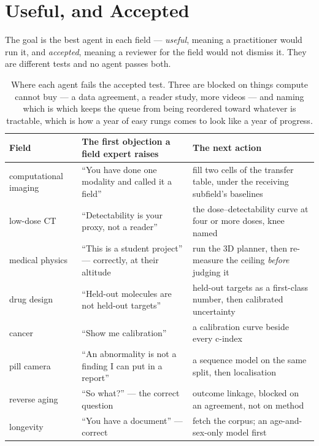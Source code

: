 \documentclass[11pt]{article}
\theoremstyle{definition}
\begin{document}
\section{Useful, and Accepted}\label{sec:useful}

The goal is the best agent in each field --- \emph{useful}, meaning a practitioner would run it, and \emph{accepted}, meaning a reviewer for the field would not dismiss it. They are different tests and no agent passes both.

\begin{table}[!htbp]
\centering\small
\begin{tabularx}{\textwidth}{@{}lYY@{}}
\toprule
Field & The first objection a field expert raises & The next action \\
\midrule
computational imaging & ``You have done one modality and called it a field'' & fill two cells of the transfer table, under the receiving subfield's baselines \\
low-dose CT & ``Detectability is your proxy, not a reader'' & the dose--detectability curve at four or more doses, knee named \\
medical physics & ``This is a student project'' --- correctly, at their altitude & run the 3D planner, then re-measure the ceiling \emph{before} judging it \\
drug design & ``Held-out molecules are not held-out targets'' & held-out targets as a first-class number, then calibrated uncertainty \\
cancer & ``Show me calibration'' & a calibration curve beside every c-index \\
pill camera & ``An abnormality is not a finding I can put in a report'' & a sequence model on the same split, then localisation \\
reverse aging & ``So what?'' --- the correct question & outcome linkage, blocked on an agreement, not on method \\
longevity & ``You have a document'' --- correct & fetch the corpus; an age-and-sex-only model first \\
\bottomrule
\end{tabularx}
\caption{Where each agent fails the accepted test. Three are blocked on things compute cannot buy --- a data agreement, a reader study, more videos --- and naming which is which keeps the queue from being reordered toward whatever is tractable, which is how a year of easy rungs comes to look like a year of progress.}
\label{tab:objections}
\end{table}
\end{document}
